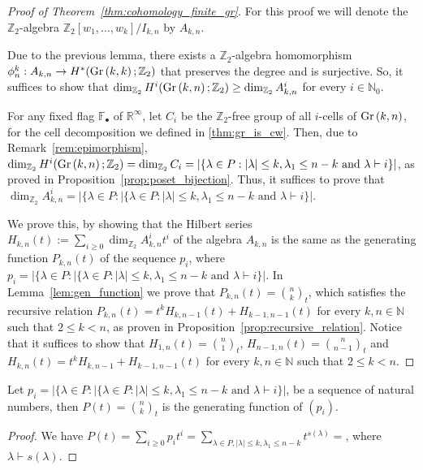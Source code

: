 \begin{proof}[Proof of Theorem~\ref{thm:cohomology_finite_gr}] For this proof we will denote the $\mathbb{Z}_2$-algebra $\mathbb{Z}_2[w_1,\ldots,w_k]/I_{k,n}$ by $A_{k,n}$.

Due to the previous lemma, there exists a $\mathbb{Z}_2$-algebra homomorphism $\phi_n^k:A_{k,n}\to H^*(\Gr{k}{k};\mathbb{Z}_2)$ that preserves the degree and is surjective. So, it suffices to show that $\dim_{\mathbb{Z}_2}H^i(\Gr{k}{n};\mathbb{Z}_2)\geq\dim_{\mathbb{Z}_2}A_{k,n}^i$ for every $i\in\mathbb{N}_0$.

For any fixed flag $\mathbb{F}_{\bullet}$ of $\mathbb{R}^{\infty}$, let $C_i$ be the $\mathbb{Z}_2$-free group of all $i$-cells of $\Gr{k}{n}$, for the cell decomposition we defined in \ref{thm:gr_is_cw}. Then, due to Remark~\ref{rem:epimorphism},  $\dim_{\mathbb{Z}_2}H^i(\Gr{k}{n};\mathbb{Z}_2)=\dim_{\mathbb{Z}_2}C_i=|\{\lambda\in P:|\lambda|\leq k,\lambda_1\leq n-k\text{ and }\lambda\vdash i\}|$, as proved in Proposition~\ref{prop:poset_bijection}. Thus, it suffices to prove that $\dim_{\mathbb{Z}_2}A_{k,n}^i=|\{\lambda\in P:|\{\lambda\in P:|\lambda|\leq k,\lambda_1\leq n-k\text{ and }\lambda\vdash i\}|$.

We prove this, by showing that the Hilbert series $H_{k,n}(t):=\sum_{i\geq0}\dim_{\mathbb{Z}_2}A_{k,n}^it^i$ of the algebra $A_{k,n}$ is the same as the generating function $P_{k,n}(t)$ of the sequence $p_i$, where $p_i=|\{\lambda\in P:|\{\lambda\in P:|\lambda|\leq k,\lambda_1\leq n-k\text{ and }\lambda\vdash i\}|$. In Lemma~\ref{lem:gen_function} we prove that $P_{k,n}(t)=\binom{n}{k}_t$, which satisfies the recursive relation $P_{k,n}(t)=t^kH_{k,n-1}(t)+H_{k-1,n-1}(t)$ for every $k,n\in\mathbb{N}$ such that $2\leq k<n$, as proven in Proposition~\ref{prop:recursive_relation}. Notice that it suffices to show that $H_{1,n}(t)=\binom{n}{1}_t$, $H_{n-1,n}(t)=\binom{n}{n-1}_t$ and $H_{k,n}(t)=t^kH_{k,n-1}+H_{k-1,n-1}(t)$ for every $k,n\in\mathbb{N}$ such that $2\leq k<n$.
\end{proof}

\begin{lemma}\label{lem:gen_function} Let $p_i=|\{\lambda\in P:|\{\lambda\in P:|\lambda|\leq k,\lambda_1\leq n-k\text{ and }\lambda\vdash i\}|$, be a sequence of natural numbers, then $P(t)=\binom{n}{k}_t$ is the generating function of $(p_i)$.
\end{lemma}
\begin{proof} We have $P(t)=\sum_{i\geq0}p_it^i=\sum_{\lambda\in P,|\lambda|\leq k,\lambda_1\leq n-k}t^{s(\lambda)}=$, where $\lambda\vdash s(\lambda)$.
\end{proof}

